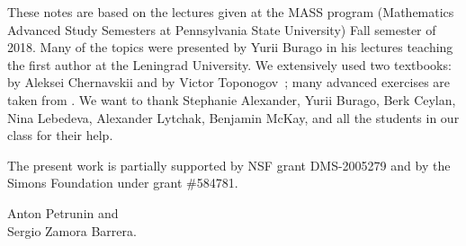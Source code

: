 These notes are based on the lectures given at the MASS program (Mathematics Advanced Study Semesters at Pennsylvania State University) Fall semester of 2018.
Many of the topics were presented by Yurii Burago in his lectures teaching the first author at the Leningrad University.
We extensively used two textbooks: by Aleksei Chernavskii \cite{chernavsky} and by Victor Toponogov~\cite{toponogov-book};
many advanced exercises are taken from \cite{petrunin2020}.
We want to thank
Stephanie Alexander,
Yurii Burago, 
Berk Ceylan,
Nina Lebedeva,
Alexander Lytchak,
Benjamin McKay,
and all the students in our class
for their help.

The present work is partially supported by NSF grant DMS-2005279
and by the Simons Foundation under grant \#584781.

\begin{flushright}
Anton Petrunin and\\
Sergio Zamora Barrera.
\end{flushright}




